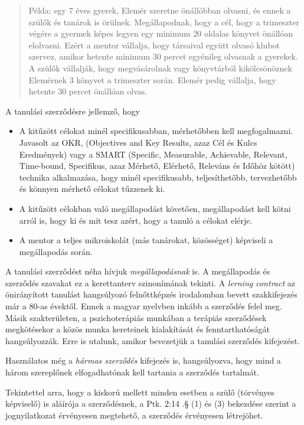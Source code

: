 \begin{quote}
Példa: egy 7 éves gyerek, Elemér szeretne önállóbban olvasni, és ennek a szülők és tanárok is örülnek. Megállapodnak, hogy a cél, hogy a trimeszter végére a gyermek képes legyen egy minimum 20 oldalas könyvet önállóan elolvasni. Ezért a mentor vállalja, hogy társaival együtt olvasó klubot szervez, amikor hetente minimum 30 percet egyénileg olvasnak a gyerekek.
A szülők vállalják, hogy megvásárolnak vagy könyvtárból kikölcsönöznek Elemérnek 3 könyvet a trimeszter során. Elemér pedig vállalja, hogy hetente 30 percet önállóan olvas.
\end{quote}

A tanulási szerződésre jellemző, hogy
\begin{itemize}
\item A kitűzött célokat minél specifikusabban, mérhetőbben kell megfogalmazni. Javasolt az OKR,  (Objectives and Key Results, azaz  Cél és Kulcs Eredmények)\cite{okr} vagy a SMART (Specific, Measurable, Achievable, Relevant, Time-bound, Specifikus, azaz Mérhető, Elérhető, Releváns és Időhöz kötött)\cite{wiki:smart} technika alkalmazása, hogy minél specifikusabb, teljesíthetőbb, tervezhetőbb és könnyen mérhető célokat tűzzenek ki.

\item A kitűzött célokban való megállapodást követően, megállapodást  kell kötni arról is, hogy ki és mit tesz azért, hogy a tanuló a célokat elérje.

\item A mentor a teljes mikroiskolát (más tanárokat, közösséget) képviseli a megállapodás során.
\end{itemize}

A tanulási szerződést néha hívjuk \emph{megállapodásnak} is. A megállapodás és szerződés szavakat ez a kerettanterv szinonímának tekinti. A \emph{lerning contract} az önirányított tanulást hangsúlyozó felnőttképzés irodalomban
bevett szakkifejezés már a 80-as évektől\cite{Malcolm77}. Ennek a magyar nyelvben inkább a szerződés felel meg. Másik szakterületen, a pszichoterápiás munkában a terápiás szerződések megkötésekor a közös munka kereteinek kialakítását és fenntarthatóságát hangsúlyozzák.\cite{pszichoterapia} Erre is utalunk, amikor bevezetjük a tanulási szerződés kifejezést.

 Használatos még a \emph{hármas szerződés} kifejezés is, hangsúlyozva, hogy mind a három szereplőnek elfogadhatónak kell tartania a szerződés tartalmát.

Tekintettel arra, hogy a kiskorú mellett minden esetben a szülő (törvényes képviselő) is aláírója a szerződésnek, a Ptk. 2:14 .§ (1) és (3) bekezdése szerint a jognyilatkozat érvényesen megtehető, a szerződés érvényesen létrejöhet.

